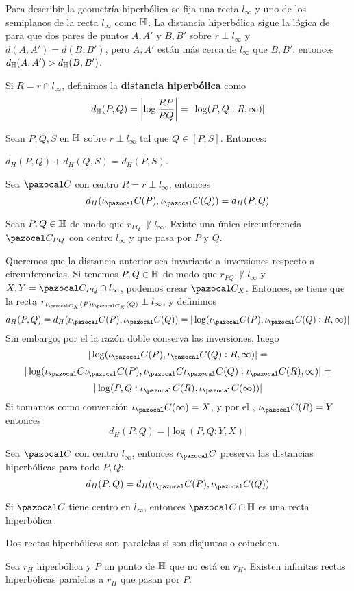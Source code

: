  Para describir la geometría hiperbólica se fija una recta $l_{\infty}$ y uno de los semiplanos de la recta $l_\infty$ como $\mathbb{H}$. La distancia hiperbólica sigue la lógica de para que dos pares de puntos $A, A'$ y $B,B'$ sobre $r\perp l_\infty$ y $d(A,A') = d(B,B')$, pero $A,A'$ están más cerca de $l_\infty$ que $B, B'$, entonces $d_{\mathbb{H}}(A,A') > d_{\mathbb{H}}(B,B')$.

Si $R = r\cap l_\infty$, definimos la \textbf{distancia hiperbólica} como
$$d_{\mathbb{H}}(P,Q) = \left| \log \frac{RP}{RQ} \right| = |\log(P,Q:R,\infty)| $$

 Sean $P,Q,S$ en $\mathbb{H}$ sobre $r \perp l_\infty$ tal que $Q\in[P,S]$. Entonces:
\begin{itemizex}
	\item $d_H (P,Q) + d_H(Q,S) = d_H(P,S)$.
	\item Sea $\C$ con centro $R = r \perp l_\infty$, entonces
	$$d_H(\iota_\C(P), \iota_\C(Q)) = d_H(P,Q)$$
\end{itemizex}

 Sean $P,Q \in \mathbb{H}$ de modo que $r_{PQ} \not\perp l_\infty$. Existe una única circunferencia $\C_{PQ}$ con centro $l_\infty$ y que pasa por $P$ y $Q$.

 Queremos que la distancia anterior sea invariante a inversiones respecto a circunferencias. 
Si tenemos  $P,Q \in \mathbb{H}$ de modo que $r_{PQ} \not\perp l_\infty$ y $X,Y = \C_{PQ}\cap l_\infty$, podemos crear $\C_X$. Entonces, se tiene que la recta $r_{\iota_{\C_X}(P)\iota_{\C_X}(Q)} \perp l_\infty$, y definimos 
$$d_H(P,Q) = d_H(\iota_\C(P), \iota_\C(Q)) = |\log(\iota_\C(P), \iota_\C(Q):R,\infty)|$$
Sin embargo, por el  la razón doble conserva las inversiones, luego
$$|\log(\iota_\C(P), \iota_\C(Q):R,\infty)| =$$$$ |\log(\iota_\C\iota_\C(P), \iota_\C\iota_\C(Q):\iota_\C(R),\infty)| =$$
$$|\log(P, Q:\iota_\C(R),\iota_\C(\infty))|$$
Si tomamos como convención $\iota_\C(\infty) = X$, y por el , $\iota_\C(R) = Y$ entonces
$$d_H(P,Q) = |\log(P,Q:Y,X)|$$

 Sea $\C$ con centro $l_\infty$, entonces $\iota_\C$ preserva las distancias hiperbólicas para todo $P,Q$:
$$d_H(P,Q) = d_H(\iota_\C(P), \iota_\C(Q))$$

 Si $\C$ tiene centro en $l_\infty$, entonces $\C \cap \H$ es una recta hiperbólica.

 Dos rectas hiperbólicas son paralelas si son disjuntas o coinciden.

 Sea $r_H$ hiperbólica y $P$ un punto de $\mathbb{H}$ que no está en $r_H$. Existen infinitas rectas hiperbólicas paralelas a $r_H$ que pasan por $P$.




 

